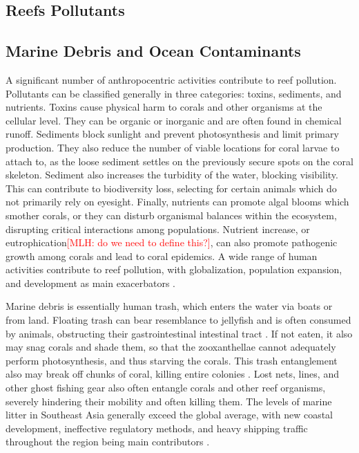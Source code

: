 \documentclass{book}\usepackage{knitr}
\newcommand{\red}[1]{\textcolor{red}{[MLH: #1]}}
\begin{document}
\begin{knitrout}
\begin{kframe}
{\section{Reefs Pollutants}

\subsection{Marine Debris and Ocean Contaminants} \label{sub:mdoc}

A significant number of anthropocentric activities contribute to reef pollution. Pollutants can be classified generally in three categories: toxins, sediments, and nutrients. Toxins cause physical harm to corals and other organisms at the cellular level. They can be organic or inorganic and are often found in chemical runoff. Sediments block sunlight and prevent photosynthesis and limit primary production. They also reduce the number of viable locations for coral larvae to attach to, as the loose sediment settles on the previously secure spots on the coral skeleton. Sediment also increases the turbidity of the water, blocking visibility. This can contribute to biodiversity loss, selecting for certain animals which do not primarily rely on eyesight. Finally, nutrients can promote algal blooms which smother corals, or they can disturb organismal balances within the ecosystem, disrupting critical interactions among populations. Nutrient increase, or eutrophication\red{do we need to define this?}, can also promote pathogenic growth among corals and lead to coral epidemics. A wide range of human activities contribute to reef pollution, with globalization, population expansion, and development as main exacerbators \citep{4884777420100401}.

Marine debris is essentially human trash, which enters the water via boats or from land. Floating trash can bear resemblance to jellyfish and is often consumed by animals, obstructing their gastrointestinal intestinal tract \citep{coralreefalliance_2021}. If not eaten, it also may snag corals and shade them, so that the zooxanthellae cannot adequately perform photosynthesis, and thus starving the corals. This trash entanglement also may break off chunks of coral, killing entire colonies \citep{USEPA_2017}. Lost nets, lines, and other ghost fishing gear also often entangle corals and other reef organisms, severely hindering their mobility and often killing them. The levels of marine litter in Southeast Asia generally exceed the global average, with new coastal development, ineffective regulatory methods, and heavy shipping traffic throughout the region being main contributors \citep{4884777420100401}.

}
\end{kframe}
\end{knitrout}
\end{document}
